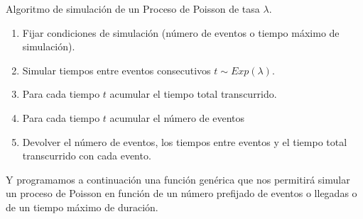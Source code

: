 \documentclass[
]{book}
\providecommand{\tightlist}{%
  \setlength{\itemsep}{0pt}\setlength{\parskip}{0pt}}
\newenvironment{silverbox}{
  \definecolor{shadecolor}{rgb}{192, 192, 192}  
  \color{black}
  \begin{shaded}}
 {\end{shaded}}
\theoremstyle{definition}
\theoremstyle{definition}
\theoremstyle{definition}
\theoremstyle{definition}
\theoremstyle{remark}
\begin{document}
\begin{silverbox}

Algoritmo de simulación de un Proceso de Poisson de tasa \(\lambda\).

\begin{enumerate}
\def\labelenumi{\arabic{enumi}.}
\tightlist
\item
  Fijar condiciones de simulación (número de eventos o tiempo máximo de simulación).
\item
  Simular tiempos entre eventos consecutivos \(t \sim Exp(\lambda)\).
\item
  Para cada tiempo \(t\) acumular el tiempo total transcurrido.
\item
  Para cada tiempo \(t\) acumular el número de eventos
\item
  Devolver el número de eventos, los tiempos entre eventos y el tiempo total transcurrido con cada evento.
\end{enumerate}

\end{silverbox}

Y programamos a continuación una función genérica que nos permitirá simular un proceso de Poisson en función de un número prefijado de eventos o llegadas o de un tiempo máximo de duración.
\end{document}
